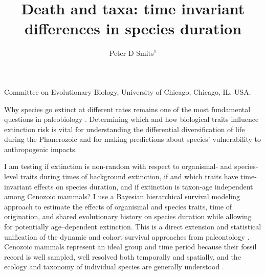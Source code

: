 \documentclass{nature}
\title{Death and taxa: time invariant differences in species duration}
\author{Peter D Smits$^{1}$}
\begin{document}
\maketitle

\begin{affiliations}
\item Committee on Evolutionary Biology, University of Chicago, Chicago, IL, USA.
\end{affiliations}

\begin{abstract}
\end{abstract}


Why species go extinct at different rates remains one of the most fundamental questions in paleobiology \cite{Simpson1944,VanValen1973,Raup1991b,Raup1994,Quental2013,Wagner2014b}. Determining which and how biological traits influence extinction risk is vital for understanding the differential diversification of life during the Phanerozoic and for making predictions about species' vulnerability to anthropogenic impacts. 

I am testing if extinction is non-random with respect to organismal- and species-level traits during times of background extinction, if and which traits have time-invariant effects on species duration, and if extinction is taxon-age independent among Cenozoic mammals? I use a Bayesian hierarchical survival modeling approach to estimate the effects of organismal and species traits, time of origination, and shared evolutionary history on species duration while allowing for potentially age--dependent extinction. This is a direct extension and statistical unification of the dynamic and cohort survival approaches from paleontology \cite{VanValen1973,Raup1978}. Cenozoic mammals represent an ideal group and time period because their fossil record is well sampled, well resolved both temporally and spatially, and the ecology and taxonomy of individual species are generally understood \cite{Alroy2009,Alroy2000g,Liow2008,Smith2004,Quental2013,Alroy1998,Simpson1944,Tomiya2013,Marcot2014}. 
\end{document}
